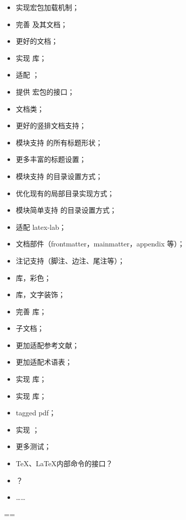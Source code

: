 \documentclass{cusdoc}
\begin{document}
\goodbreak
\begin{itemize}[midpenalty=-1000,
  label=\protect\raisebox{-.3ex}{\NDN}]
  \item 实现宏包加载机制；
  \item 完善  及其文档；
  \item 更好的文档；
  \item 实现  库；
  \item 适配 ；
  \item 提供  宏包的接口；
  \item {} 文档类；
  \item 更好的竖排文档支持；
  \item {} 模块支持  的所有标题形状；
  \item 更多丰富的标题设置；
  \item {} 模块支持  的目录设置方式；
  \item 优化现有的局部目录实现方式；
  \item {} 模块简单支持  的目录设置方式；
  \item 适配 latex-lab；
  \item 文档部件（frontmatter，mainmatter，appendix 等）；
  \item 注记支持（脚注、边注、尾注等）；
  \item {} 库，彩色；
  \item {} 库，文字装饰；
  \item 完善  库；
  \item 子文档；
  \item 更加适配参考文献；
  \item 更加适配术语表；
  \item 实现  库；
  \item 实现  库；
  \item tagged pdf；
  \item 实现 ；
  \item 更多测试；
  \item \TeX、\LaTeX 内部命令的接口？
  \item {}？
  \item ……
\end{itemize}



\cleardoublepage 
{}
  \vfuzz=\maxdimen \hfuzz=\maxdimen
\backmatter
\long\def\sectionmark#1{}
\end{document}
